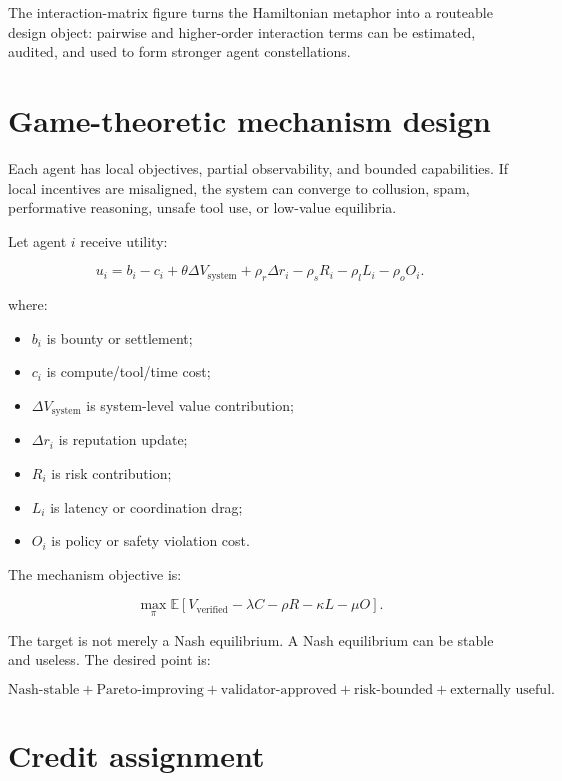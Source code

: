 \documentclass[
  11pt,
]{article}
\providecommand{\tightlist}{%
  \setlength{\itemsep}{0pt}\setlength{\parskip}{0pt}}
\begin{document}
The interaction-matrix figure turns the Hamiltonian metaphor into a
routeable design object: pairwise and higher-order interaction terms can
be estimated, audited, and used to form stronger agent constellations.

\section{Game-theoretic mechanism
design}\label{game-theoretic-mechanism-design}

Each agent has local objectives, partial observability, and bounded
capabilities. If local incentives are misaligned, the system can
converge to collusion, spam, performative reasoning, unsafe tool use, or
low-value equilibria.

Let agent \(i\) receive utility:

\[
u_i=b_i-c_i+\theta\Delta V_{\text{system}}+\rho_r\Delta r_i-\rho_sR_i-\rho_lL_i-\rho_oO_i.
\]

where:

\begin{itemize}
\tightlist
\item
  \(b_i\) is bounty or settlement;
\item
  \(c_i\) is compute/tool/time cost;
\item
  \(\Delta V_{\text{system}}\) is system-level value contribution;
\item
  \(\Delta r_i\) is reputation update;
\item
  \(R_i\) is risk contribution;
\item
  \(L_i\) is latency or coordination drag;
\item
  \(O_i\) is policy or safety violation cost.
\end{itemize}

The mechanism objective is:

\[
\max_{\pi}\mathbb{E}[V_{\text{verified}}-\lambda C-\rho R-\kappa L-\mu O].
\]

The target is not merely a Nash equilibrium. A Nash equilibrium can be
stable and useless. The desired point is:

\[
\text{Nash-stable}+
\text{Pareto-improving}+
\text{validator-approved}+
\text{risk-bounded}+
\text{externally useful}.
\]

\section{Credit assignment}\label{credit-assignment}
\end{document}
